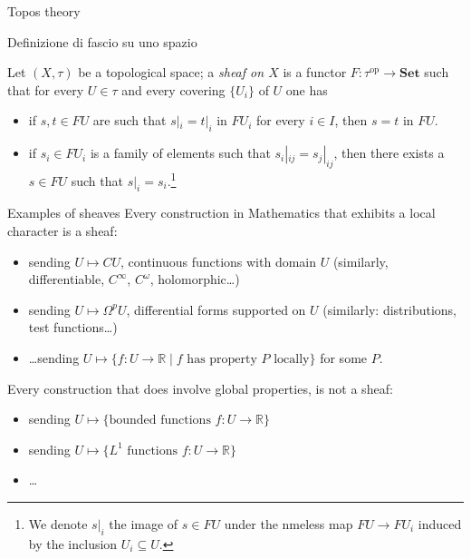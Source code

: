 \documentclass[presentation]{beamer}
\def\Set{\mathbf{Set}}
\newcommand{\op}{\text{op}}
\begin{document}
\begin{frame}[label={sec:org5a55f3f}]{Topos theory}
\end{frame}
\begin{frame}[label={sec:orgd0201f8}]{Definizione di fascio su uno spazio}
  \begin{block}{}
    Let $(X,\tau)$ be a topological space; a \emph{sheaf on $X$} is a functor $F : \tau^\op\to \Set$ such that for every $U\in\tau$ and every covering $\{U_i\}$ of $U$ one has
    \begin{itemize}
      \item<+-> if $s, t\in FU$ are such that $s|_i = t|_i$ in $FU_i$ for every $i\in I$, then $s=t$ in $FU$.
      \item<+-> if $s_i\in FU_i$ is a family of elements such that $s_i|_{ij} = s_j|_{ij}$, then there exists a $s\in FU$ such that $s|_i = s_i$.\footnote{We denote $s|_i$ the image of $s\in FU$ under the nmeless map $FU\to FU_i$ induced by the inclusion $U_i\subseteq U$.}
    \end{itemize}
  \end{block}
\end{frame}
\begin{frame}{Examples of sheaves}
  Every construction in Mathematics that exhibits a local character is a sheaf: 
\begin{itemize}
  \item<+-> sending $U\mapsto CU$, continuous functions with domain $U$ (similarly, differentiable, $C^\infty$, $C^\omega$, holomorphic\dots) 
  \item<+-> sending $U\mapsto \Omega^pU$, differential forms supported on $U$ (similarly: distributions, test functions\dots)
  \item<+-> \dots sending $U\mapsto \{f : U \to \mathbb R \mid f \text{ has property $P$ locally}\}$ for some $P$.
\end{itemize}
\onslide<+->
  Every construction that does involve global properties, is not a sheaf:
  \begin{itemize}
    \item<+-> sending $U\mapsto \{\text{bounded functions } f : U \to \mathbb R\}$ 
    \item<+-> sending $U\mapsto \{L^1\text{ functions } f : U \to \mathbb R\}$ 
    \item<+-> \dots
  \end{itemize}
\end{frame}
\end{document}

